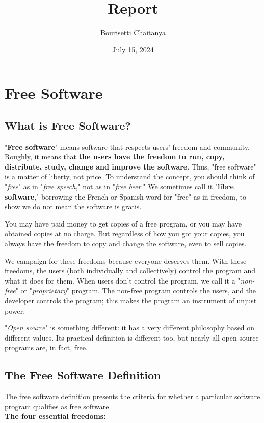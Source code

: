 \documentclass[6pt,a4paper]{report}
\author{Bourisetti Chaitanya}
\title{Report}
\date{July 15, 2024}
\begin{document}
\maketitle
\chapter{Free Software}
\section*{What is Free Software?}
"\textbf{Free software}" means software that respects users' freedom and community. Roughly, it means that \textbf{the users have the freedom to run, copy, distribute, study, change and improve the software}. Thus, "free software" is a matter of liberty, not price. To understand the concept, you should think of "\textit{free}" as in "\textit{free speech}," not as in "\textit{free beer}." We sometimes call it "\textbf{libre software}," borrowing the French or Spanish word for "free" as in freedom, to show we do not mean the software is gratis.

You may have paid money to get copies of a free program, or you may have obtained copies at no charge. But regardless of how you got your copies, you always have the freedom to copy and change the software, even to sell copies.

We campaign for these freedoms because everyone deserves them. With these freedoms, the users (both individually and collectively) control the program and what it does for them. When users don't control the program, we call it a "\textit{non-free}" or "\textit{proprietary}" program. The non-free program controls the users, and the developer controls the program; this makes the program an instrument of unjust power.

"\emph{Open source}" is something different: it has a very different philosophy based on different values. Its practical definition is different too, but nearly all open source programs are, in fact, free. 

\section*{The Free Software Definition}
The free software definition presents the criteria for whether a particular software program qualifies as free software. \\
\textbf{The four essential freedoms:}		\\
\end{document}
